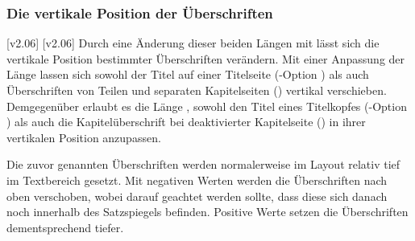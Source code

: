 \begin{Declaration*}{}
\begin{Declaration*}{}
\begin{Declaration*}{}
\subsubsection{Die vertikale Position der Überschriften}
\begin{Declaration}[v2.02]{}
\begin{Declaration}[v2.02]{}
\printdeclarationlist%
%
%
%
[v2.06]
[v2.06]
Durch eine Änderung dieser beiden Längen mit  lässt sich die 
vertikale Position bestimmter Überschriften verändern. Mit einer Anpassung der  
Länge  lassen sich sowohl der Titel auf einer 
Titelseite (\KOMAScript-Option ) als auch Überschriften 
von Teilen und separaten Kapitelseiten () vertikal 
verschieben. Demgegenüber erlaubt es die Länge , sowohl 
den Titel eines Titelkopfes (\KOMAScript-Option ) als 
auch die Kapitelüberschrift bei deaktivierter Kapitelseite 
() in ihrer vertikalen Position anzupassen.

Die zuvor genannten Überschriften werden normalerweise im Layout relativ tief 
im Textbereich gesetzt. Mit negativen Werten werden die Überschriften nach oben 
verschoben, wobei darauf geachtet werden sollte, dass diese sich danach noch 
innerhalb des Satzspiegels befinden. Positive Werte setzen die Überschriften 
dementsprechend tiefer.
%
\end{Declaration}
\end{Declaration}




\end{Declaration*}
\end{Declaration*}
\end{Declaration*}
